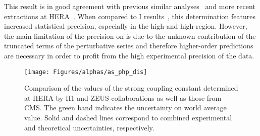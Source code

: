 This result is in good agreement with previous similar analyses~\cite{HERAIjets} and more recent extractions at HERA~\cite{britzger}. When compared to \hera I results~\cite{}, this determination features increased statistical precision, especially in the high-\etjetb and high-\qsq region. However, the main limitation of the precision on \asz is due to the unknown contribution of the truncated terms of the perturbative series and therefore higher-order predictions are necessary in order to profit from the high experimental precision of the data.

\begin{figure}[htpb]
	\centering
		\texttt{[image: Figures/alphas/as\_php\_dis]}
	\caption{Comparison of the values of the strong coupling constant determined at HERA by H1 and ZEUS collaborations as well as those from CMS. The green band indicates the uncertainty on world average \as value. Solid and dashed lines correspond to combined experimental and theoretical uncertainties, respectively.}
	\label{fig:as_php_dis}
\end{figure}
